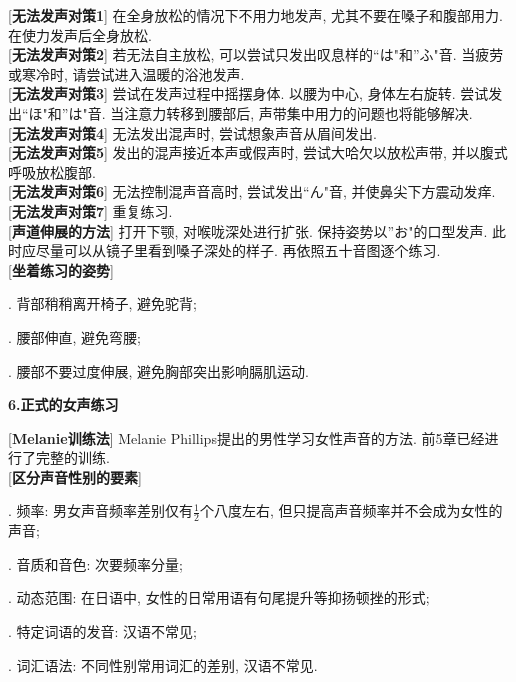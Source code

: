 [\textbf{无法发声对策1}] 在全身放松的情况下不用力地发声, 尤其不要在嗓子和腹部用力. 在使力发声后全身放松.\\

[\textbf{无法发声对策2}] 若无法自主放松, 可以尝试只发出叹息样的``は"和''ふ"音. 当疲劳或寒冷时, 请尝试进入温暖的浴池发声.\\

[\textbf{无法发声对策3}] 尝试在发声过程中摇摆身体. 以腰为中心, 身体左右旋转. 尝试发出``ほ"和''は"音. 当注意力转移到腰部后, 声带集中用力的问题也将能够解决.\\

[\textbf{无法发声对策4}] 无法发出混声时, 尝试想象声音从眉间发出.\\

[\textbf{无法发声对策5}] 发出的混声接近本声或假声时, 尝试大哈欠以放松声带, 并以腹式呼吸放松腹部.\\

[\textbf{无法发声对策6}] 无法控制混声音高时, 尝试发出``ん"音, 并使鼻尖下方震动发痒.\\

[\textbf{无法发声对策7}] 重复练习.\\

[\textbf{声道伸展的方法}] 打开下颚, 对喉咙深处进行扩张. 保持姿势以''お"的口型发声. 此时应尽量可以从镜子里看到嗓子深处的样子. 再依照五十音图逐个练习.\\

[\textbf{坐着练习的姿势}]\par
{}. 背部稍稍离开椅子, 避免驼背;\par
{}. 腰部伸直, 避免弯腰;\par
{}. 腰部不要过度伸展, 避免胸部突出影响膈肌运动.\\

\clearpage

\begin{center}
 \textbf{6.正式的女声练习}
\end{center}

[\textbf{Melanie训练法}] Melanie Phillips提出的男性学习女性声音的方法. 前5章已经进行了完整的训练.\\

[\textbf{区分声音性别的要素}]\par
{}. 频率: 男女声音频率差别仅有$\frac{1}{2}$个八度左右, 但只提高声音频率并不会成为女性的声音;\par
{}. 音质和音色: 次要频率分量;\par
{}. 动态范围: 在日语中, 女性的日常用语有句尾提升等抑扬顿挫的形式;\par
{}. 特定词语的发音: 汉语不常见;\par
{}. 词汇语法: 不同性别常用词汇的差别, 汉语不常见.\\


